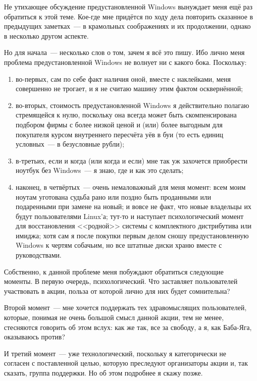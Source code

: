 Не утихающее обсуждение предустановленной Windows вынуждает меня ещё раз обратиться к этой теме. Кое-где мне придётся по ходу дела повторить сказанное в предыдущих заметках~--- в крамольных соображениях и их продолжении, однако в несколько другом аспекте.

Но для начала~--- несколько слов о том, зачем я всё это пишу. Ибо лично меня проблема предустановленной Windows не волнует ни с какого бока. Поскольку:

\begin{enumerate}
	\item во-первых, сам по себе факт наличия оной, вместе с наклейками, меня совершенно не трогает, и я не считаю машину этим фактом осквернённой; 
	\item во-вторых, стоимость предустановленной Windows я действительно полагаю стремящейся к нулю, поскольку она всегда может быть скомпенсирована подбором фирмы с более низкой ценой и (или) более выгодным для покупателя курсом внутреннего пересчёта уёв в буи (то есть единиц условных~--- в безусловные рубли); 
	\item в-третьих, если и когда (или когда и если) мне так уж захочется приобрести ноутбук без Windows~--- я знаю, где и как это сделать;
	\item наконец, в четвёртых~--- очень немаловажный для меня момент: всем моим ноутам уготована судьба рано или поздно быть проданными или подаренными при замене на новый; и вовсе не факт, что новые владельцы их будут пользователями Linux'а; тут-то и наступает психологический момент для восстановления <<родной>> системы с комплектного дистрибутива или имиджа; хотя сам я после покупки первым делом сношу предустановленную Windows к чертям собачьим, но все штатные диски храню вместе с руководствами.
\end{enumerate}


Собственно, к данной проблеме меня побуждают обратиться следующие моменты. В первую очередь, психологический. Что заставляет пользователей участвовать в акции, польза от которой лично для них будет сомнительна?

Второй момент~--- мне хочется поддержать тех здравомыслящих пользователей, которые, понимая не очень большой смысл данной акции, тем не менее, стесняются говорить об этом вслух: как же так, все за свободу, а я, как Баба-Яга, оказываюсь против?

И третий момент~--- уже технологический, поскольку я категорически не согласен с поставленной целью, которую преследуют организаторы акции и, так сказать, группа поддержки. Но об этом подробнее я скажу позже.

